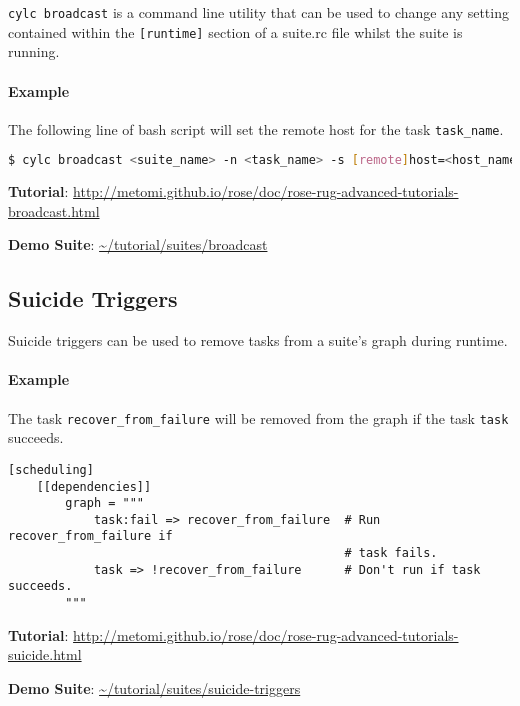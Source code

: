 \lstinline[language=bash]{cylc broadcast} is a command line utility that can
be used to change any setting contained within the \lstinline{[runtime]}
section of a suite.rc file whilst the suite is running.

\paragraph*{Example} The following line of bash script will set the remote
host for the task \lstinline{task_name}.

\begin{lstlisting}[language=bash]
$ cylc broadcast <suite_name> -n <task_name> -s [remote]host=<host_name>
\end{lstlisting}

\begin{shaded*}
\textbf{Tutorial}: \url{http://metomi.github.io/rose/doc/rose-rug-advanced-tutorials-broadcast.html}

\textbf{Demo Suite}:
\url{~/tutorial/suites/broadcast}
\end{shaded*}

\subsection{Suicide Triggers}

Suicide triggers can be used to remove tasks from a suite's graph during
runtime.

\paragraph*{Example}

The task \lstinline{recover_from_failure} will be removed from the graph if
the task \lstinline{task} succeeds.

\begin{lstlisting}
[scheduling]
    [[dependencies]]
        graph = """
            task:fail => recover_from_failure  # Run recover_from_failure if
                                               # task fails.
            task => !recover_from_failure      # Don't run if task succeeds.
        """
\end{lstlisting}

\begin{shaded*}
\textbf{Tutorial}: \url{http://metomi.github.io/rose/doc/rose-rug-advanced-tutorials-suicide.html}

\textbf{Demo Suite}:
\url{~/tutorial/suites/suicide-triggers}
\end{shaded*}

